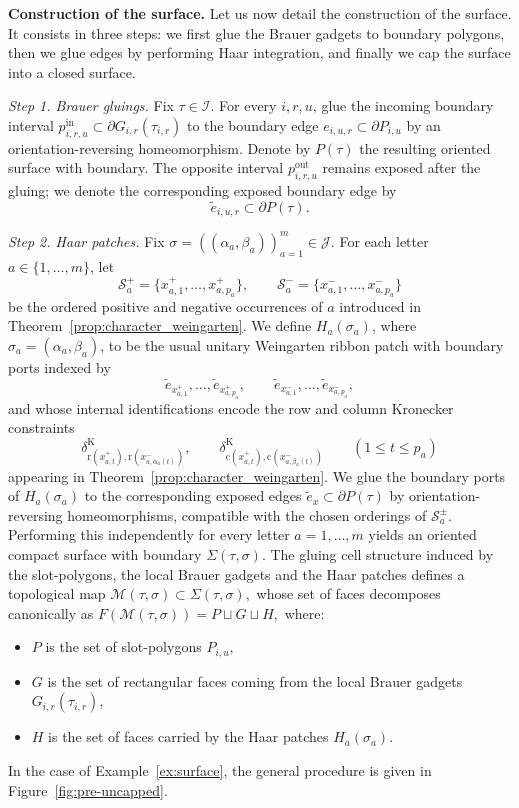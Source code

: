 \documentclass[11pt,a4paper,reqno]{article}
\theoremstyle{definition}
\theoremstyle{remark}
\newcommand\M{{\mathcal{M}}}
\begin{document}
\medskip

{\bf Construction of the surface.} Let us now detail the construction of the surface. It consists in three steps: we first glue the Brauer gadgets to boundary polygons, then we glue edges by performing Haar integration, and finally we cap the surface into a closed surface.

\medskip

\emph{Step 1. Brauer gluings.} Fix $\tau \in\mathcal I$. For every $i,r,u$, glue the incoming boundary interval $p^{\mathrm{in}}_{i,r,u}\subset \partial G_{i,r}(\tau_{i,r})$ to the boundary edge $e_{i,u,r}\subset \partial P_{i,u}$ by an orientation-reversing homeomorphism. Denote by $P(\tau)$ the resulting oriented surface with boundary. The opposite interval $p^{\mathrm{out}}_{i,r,u}$ remains exposed after the gluing; we denote the corresponding exposed boundary edge by
\[
\widetilde e_{i,u,r}\subset \partial P(\tau).
\]

\medskip

\emph{Step 2. Haar patches.} Fix $\sigma=((\alpha_a,\beta_a))_{a=1}^m\in \mathcal J$. For each letter $a\in\{1,\dots,m\}$, let
\[
\mathcal{S}_a^+=\{x_{a,1}^+,\dots,x_{a,p_a}^+\},\qquad \mathcal{S}_a^-=\{x_{a,1}^-,\dots,x_{a,p_a}^-\}
\]
be the ordered positive and negative occurrences of $a$ introduced in Theorem~\ref{prop:character_weingarten}. We define $H_a(\sigma_a)$, where $\sigma_a=(\alpha_a,\beta_a)$, to be the usual unitary Weingarten ribbon patch with boundary ports indexed by
\[
\widetilde e_{x_{a,1}^+},\dots,\widetilde e_{x_{a,p_a}^+}, \qquad \widetilde e_{x_{a,1}^-},\dots,\widetilde e_{x_{a,p_a}^-},
\]
and whose internal identifications encode the row and column Kronecker constraints
\[
\delta^{\mathrm K}_{\mathrm r(x_{a,t}^+),\mathrm r(x_{a,\alpha_a(t)}^-)},\qquad
\delta^{\mathrm K}_{\mathrm c(x_{a,t}^+),\mathrm c(x_{a,\beta_a(t)}^-)}
\qquad (1\le t\le p_a)
\]
appearing in Theorem~\ref{prop:character_weingarten}. We glue the boundary ports of $H_a(\sigma_a)$ to the corresponding exposed edges $\widetilde e_x\subset \partial P(\tau)$ by orientation-reversing homeomorphisms, compatible with the chosen orderings of $\mathcal{S}_a^\pm$. Performing this independently for every letter $a=1,\dots,m$ yields an oriented compact surface with boundary $\Sigma(\tau,\sigma).$ The gluing cell structure induced by the slot-polygons, the local Brauer gadgets and the Haar patches defines a topological map $\M(\tau,\sigma)\subset \Sigma(\tau,\sigma),$ whose set of faces decomposes canonically as $F(\M(\tau,\sigma)) = P \sqcup G \sqcup H,$ where:
\begin{itemize}
\item $P$ is the set of slot-polygons $P_{i,u}$,
\item $G$ is the set of rectangular faces coming from the local Brauer gadgets
$G_{i,r}(\tau_{i,r})$,
\item $H$ is the set of faces carried by the Haar patches $H_a(\sigma_a)$.
\end{itemize}
In the case of Example~\ref{ex:surface}, the general procedure is given in Figure~\ref{fig:pre-uncapped}.
\end{document}
